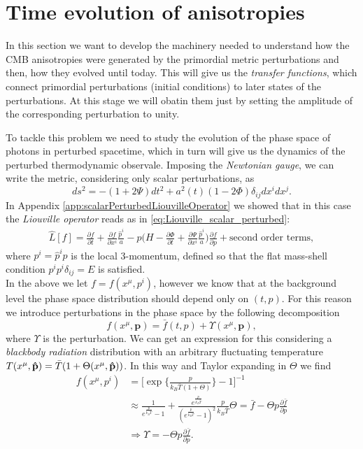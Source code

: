 \section{Time evolution of anisotropies}\label{sec:ThetaTimeEvolution}
In this section we want to develop the machinery needed to understand how the CMB anisotropies were generated by the primordial metric perturbations and then, how they evolved until today. This will give us the \emph{transfer functions}, which connect primordial perturbations (initial conditions) to later states of the perturbations. At this stage we will obatin them just by setting the amplitude of the corresponding perturbation to unity.

To tackle this problem we need to study the evolution of the phase space of photons in perturbed spacetime, which in turn will give us the dynamics of the perturbed thermodynamic observale. Imposing the \emph{Newtonian gauge}, we can write the metric, considering only scalar perturbations, as
$$ds^2 = -(1+2\Psi)dt^2 + a^2(t)(1-2\Phi)\delta_{ij}dx^idx^j.$$
In Appendix \ref{app:scalarPerturbedLiouvilleOperator} we showed that in this case the \emph{Liouville operator} reads as in \eqref{eq:Liouville_scalar_perturbed}:
\begin{align*}
    \hat{L}[f]=\frac{\partial f}{\partial t}+\frac{\partial f}{\partial x^i}\frac{\hat p^i}{a}-p\bigg(H-\frac{\partial \Phi}{\partial t}+\frac{\partial \Psi}{\partial x^i}\frac{\hat p^i}{a}\bigg)\frac{\partial f}{\partial p}+\text{second order terms},
\end{align*}
where $p^i=\hat p^i p$ is the local 3-momentum, defined so that the flat mass-shell condition $p^ip^i\delta_{ij}=E$ is satisfied.\\In the above we let $f=f(x^\mu,p^i)$, however we know that at the background level the phase space distribution should depend only on $(t,p)$. For this reason we introduce perturbations in the phase space by the following decomposition
\begin{equation}\label{eq:phspdist_perturb}
    f(x^\mu,\mathbf p) = \bar f(t,p) + \Upsilon (x^\mu,\mathbf{p}),
\end{equation}
where $\Upsilon$ is the perturbation. We can get an expression for this considering a \emph{blackbody radiation} distribution with an arbitrary fluctuating temperature $T(x^\mu,\mathbf{\hat{p}})=\bar T (1+\Theta(x^\mu,\mathbf{\hat{p}}))$. In this way and Taylor expanding in $\Theta$ we find
\begin{align*}
    f(x^\mu,p^i) &= \bigg[\exp\bigg\{\frac{p}{k_B\bar T(1+\Theta)}\bigg\}-1\bigg]^{-1}\\&\approx\frac{1}{e^{\frac{p}{k_B\bar T}}-1}+\frac{e^{\frac{p}{k_B\bar T}}}{(e^{\frac{p}{k_B\bar T}}-1)^2}\frac{p}{k_B \bar T}\Theta=\bar f-\Theta p \frac{\partial\bar f}{\partial p}\\
    &\Longrightarrow \boxed{\Upsilon = -\Theta p \frac{\partial\bar f}{\partial p}}.
\end{align*}
